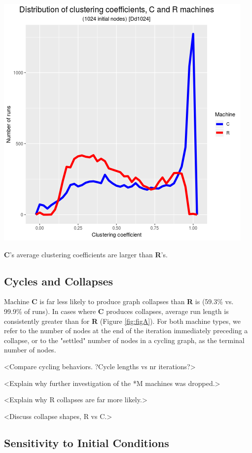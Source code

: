 \documentclass{tufte-handout}
\begin{document}
\begin{marginfigure}
  \includegraphics{figDd1024.png}
  \caption{\textbf{C}'s average clustering coefficients are larger than \textbf{R}'s.}
  \label{fig:figDd1024}
\end{marginfigure}

\subsection{Cycles and Collapses}

Machine \textbf{C} is far less likely to produce graph collapses than
\textbf{R} is (59.3\% vs. 99.9\% of runs). In cases where \textbf{C} produces
collapses, average run length is consistently greater than
for \textbf{R} (Figure \ref{fig:figA}). For both machine types, we refer to
the number of nodes at the end of the iteration immediately preceding a collapse,
or to the "settled" number of nodes in a cycling graph, as the terminal number of nodes.

<Compare cycling behaviors. ?Cycle lengths vs nr iterations?>

<Explain why further investigation of the *M machines was dropped.>

<Explain why R collapses are far more likely.>

<Discuss collapse shapes, R vs C.>

\subsection{Sensitivity to Initial Conditions}
\end{document}
